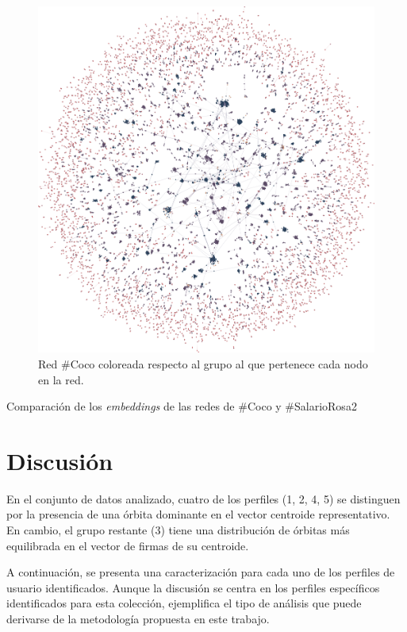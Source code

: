 \begin{figure}
    \centering
    \includegraphics[width=.75\textwidth]{images/Coco.png}
    \caption{Red \#Coco coloreada respecto al grupo al que pertenece cada nodo en la red.}
    \label{fig:net-coco}
\end{figure}


\begin{table}[h]
    \begin{center}
        \caption{Comparación de los \textit{embeddings} de las redes de \#Coco y \#SalarioRosa2}
    \end{center}
\end{table}


\section{Discusión}
En el conjunto de datos analizado, cuatro de los perfiles (1, 2, 4, 5) se distinguen por la presencia de una órbita dominante en el vector centroide representativo. En cambio, el grupo restante (3) tiene una distribución de órbitas más equilibrada en el vector de firmas de su centroide.

A continuación, se presenta una caracterización para cada uno de los perfiles de usuario identificados. Aunque la discusión se centra en los perfiles específicos identificados para esta colección, ejemplifica el tipo de análisis que puede derivarse de la metodología propuesta en este trabajo.   

